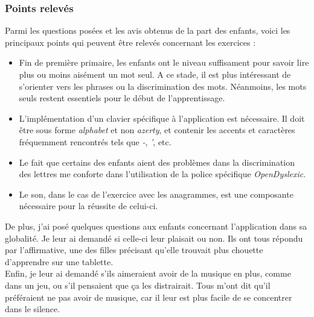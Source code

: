 \subsubsection{Points relevés \label{testPoints}}
Parmi les questions posées et les avis obtenus de la part des enfants, voici les principaux points qui peuvent être relevés concernant les exercices :
\begin{itemize}
\item Fin de première primaire, les enfants ont le niveau suffisament pour savoir lire plus ou moins aisément un mot seul. A ce stade, il est plus intéressant de s'orienter vers les phrases ou la discrimination des mots. Néanmoins, les mots seuls restent essentiels pour le début de l'apprentissage.
\item L'implémentation d'un clavier spécifique à l'application est nécessaire. Il doit être sous forme \textit{alphabet} et non \textit{azerty}, et contenir les accents et caractères fréquemment rencontrés tels que \textit{-}, \textit{'}, etc.
\item Le fait que certains des enfants aient des problèmes dans la discrimination des lettres me conforte dans l'utilisation de la police spécifique \textit{OpenDyslexic}.
\item Le son, dans le cas de l'exercice avec les anagrammes, est une composante nécessaire pour la réussite de celui-ci.\\
\end{itemize}

De plus, j'ai posé quelques questions aux enfants concernant l'application dans sa globalité. Je leur ai demandé si celle-ci leur plaisait ou non. Ils ont tous répondu par l'affirmative, une des filles précisant qu'elle trouvait plus chouette d'apprendre sur une tablette.\\
Enfin, je leur ai demandé s'ils aimeraient avoir de la musique en plus, comme dans un jeu, ou s'il pensaient que ça les distrairait. Tous m'ont dit qu'il préféraient ne pas avoir de musique, car il leur est plus facile de se concentrer dans le silence.